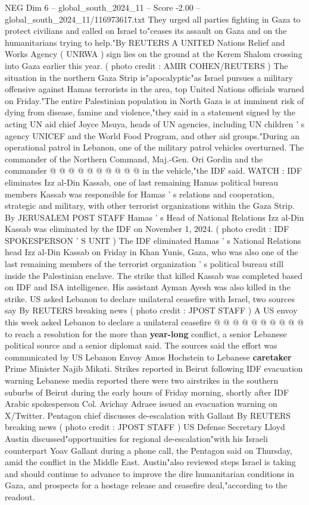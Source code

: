 \begin{textsample}{NEG Dim 6 – global\_south\_2024\_11 – Score -2.00 – global\_south\_2024\_11/116973617.txt}  \label{ex:f6_neg_062}
They urged all parties fighting in Gaza to protect civilians and called on Israel to"ceases its assault on Gaza and on the humanitarians trying to help."By REUTERS A UNITED Nations Relief and Works Agency ( UNRWA ) sign lies on the ground at the Kerem Shalom crossing into Gaza earlier this year. ( photo credit : AMIR COHEN/REUTERS ) The situation in the northern Gaza Strip is"apocalyptic"as Israel pursues a military offensive against Hamas terrorists in the area, top United Nations officials warned on Friday."The entire Palestinian population in North Gaza is at imminent risk of dying from disease, famine and violence,"they said in a statement signed by the acting UN aid chief Joyce Msuya, heads of UN agencies, including UN children ' s agency UNICEF and the World Food Program, and other aid groups."During an operational patrol in Lebanon, one of the military patrol vehicles overturned.
The commander of the Northern Command, Maj.-Gen.
Ori Gordin and the commander @ @ @ @ @ @ @ @ @ @ in the vehicle,"the IDF said.
WATCH : IDF eliminates Izz al-Din Kassab, one of last remaining Hamas political bureau members Kassab was responsible for Hamas ' s relations and cooperation, strategic and military, with other terrorist organizations within the Gaza Strip.
By JERUSALEM POST STAFF Hamas ' s Head of National Relations Izz al-Din Kassab was eliminated by the IDF on November 1, 2024. ( photo credit : IDF SPOKESPERSON ' S UNIT ) The IDF eliminated Hamas ' s National Relations head Izz al-Din Kassab on Friday in Khan Yunis, Gaza, who was also one of the last remaining members of the terrorist organization ' s political bureau still inside the Palestinian enclave.
The strike that killed Kassab was completed based on IDF and ISA intelligence.
His assistant Ayman Ayesh was also killed in the strike.
US asked Lebanon to declare unilateral ceasefire with Israel, two sources say By REUTERS breaking news ( photo credit : JPOST STAFF ) A US envoy this week asked Lebanon to declare a unilateral ceasefire @ @ @ @ @ @ @ @ @ @ to reach a resolution for the more than \textbf{year-long} conflict, a senior Lebanese political source and a senior diplomat said.
The sources said the effort was communicated by US Lebanon Envoy Amos Hochstein to Lebanese \textbf{caretaker} Prime Minister Najib Mikati.
Strikes reported in Beirut following IDF evacuation warning Lebanese media reported there were two airstrikes in the southern suburbs of Beirut during the early hours of Friday morning, shortly after IDF Arabic spokesperson Col.
Avichay Adraee issued an evacuation warning on X/Twitter.
Pentagon chief discusses de-escalation with Gallant By REUTERS breaking news ( photo credit : JPOST STAFF ) US Defense Secretary Lloyd Austin discussed"opportunities for regional de-escalation"with his Israeli counterpart Yoav Gallant during a phone call, the Pentagon said on Thursday, amid the conflict in the Middle East.
Austin"also reviewed steps Israel is taking and should continue to advance to improve the dire humanitarian conditions in Gaza, and prospects for a hostage release and ceasefire deal,"according to the readout.

\end{textsample}
